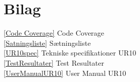 \chapter{Bilag}\label{Bilag}
\ref{Code Coverage} Code Coverage			\\					
\ref{Satningsliste} Sætningsliste 				\\
\ref{UR10spec} Tekniske specifikationer UR10		\\
\ref{TestResultater}  Test Resultater			\\
\ref{UserManualUR10}  User Manual UR10 						
